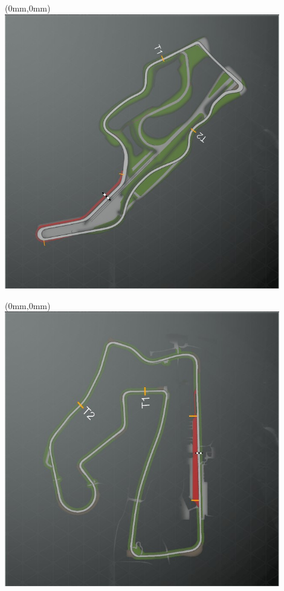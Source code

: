 \null\newpage
\begin{textblock*}{30mm}(0mm,0mm)%
\includegraphics[width=120mm]{TR/2015-05-20_00063.png}
\end{textblock*}
\null\newpage
\begin{textblock*}{30mm}(0mm,0mm)%
\includegraphics[width=120mm]{TR/2015-05-20_00051.png}
\end{textblock*}
